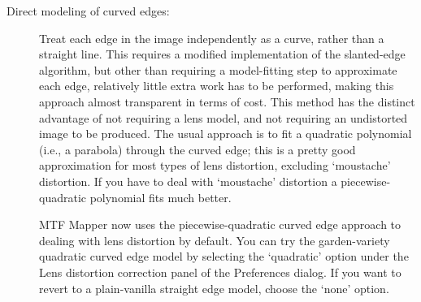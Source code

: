 \documentclass[a4paper]{article}
\begin{document}
\begin{description}
\item[Direct modeling of curved edges:]

Treat each edge in the image independently as a curve, rather than a
straight line. This requires a modified implementation of the slanted-edge
algorithm, but other than requiring a model-fitting step to approximate each edge,
relatively little extra work has to be performed, making this approach
almost transparent in terms of cost. This method has the distinct advantage
of not requiring a lens model, and not requiring an undistorted image to be
produced. The usual approach is to fit a quadratic polynomial (i.e., a
parabola) through the curved edge; this is a pretty good approximation for
most types of lens distortion, excluding `moustache' distortion. If you have
to deal with `moustache' distortion a piecewise-quadratic polynomial fits
much better.

MTF Mapper now uses the piecewise-quadratic curved edge approach to dealing
with lens distortion by default. You can try the garden-variety quadratic
curved edge model by selecting the `quadratic' option under the Lens
distortion correction panel of the \textsf{Preferences} dialog. If you want
to revert to a plain-vanilla straight edge model, choose the `none' option.

\end{description}
\end{document}

